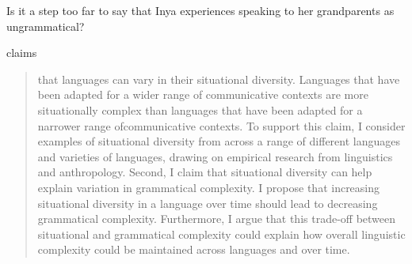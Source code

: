 Is it a step too far to say that Inya experiences speaking to her grandparents as ungrammatical? 

\citet{Grieve2023} claims

\begin{quote}
    that languages can vary in their situational diversity. Languages that have been adapted for a wider range of communicative contexts are more situationally complex than languages that have been adapted for a narrower range ofcommunicative contexts. To support this claim, I consider examples of situational diversity from across a range of different languages and varieties of languages, drawing on empirical research from linguistics and anthropology. Second, I claim that situational diversity can help explain variation in grammatical complexity. I propose that increasing situational diversity in a language over time should lead to decreasing grammatical complexity. Furthermore, I argue that this trade-off between situational and grammatical complexity could explain how overall linguistic complexity could be maintained across languages and over time.
\end{quote}